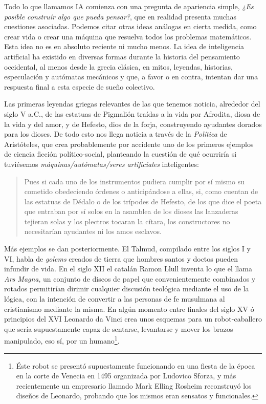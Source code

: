\documentclass[12pt]{memoir}
\begin{document}
Todo lo que llamamos IA comienza con una pregunta de apariencia simple, \textit{¿Es posible construír algo que pueda pensar?}, que en realidad presenta muchas cuestiones asociadas. Podemos citar otras ideas análogas en cierta medida, como crear vida o crear una máquina que resuelva todos los problemas matemáticos. Esta idea no es en absoluto reciente ni mucho menos. La idea de inteligencia artificial ha existido en diversas formas durante la historia del pensamiento occidental, al menos desde la grecia clásica, en mitos, leyendas, historias, especulación y autómatas mecánicos y que, a favor o en contra, intentan dar una respuesta final a esta especie de sueño colectivo.

Las primeras leyendas griegas relevantes de las que tenemos noticia, alrededor del siglo V a.C., de las estatuas de Pigmalión traídas a la vida por Afrodita, diosa de la vida y del amor, y de Hefesto, dios de la forja, construyendo ayudantes dorados para los dioses. De todo esto nos llega noticia a través de la \textit{Política} de Aristóteles, que crea probablemente por accidente uno de los primeros ejemplos de ciencia ficción político-social, planteando la cuestión de qué ocurriría si tuviésemos \textit{máquinas/autómatas/seres artificiales} inteligentes:

\blockquote{Pues si cada uno de los instrumentos pudiera cumplir por sí mismo su cometido obedeciendo órdenes o anticipándose a ellas, si, como cuentan de las estatuas de Dédalo o de los trípodes de Hefesto, de los que dice el poeta que entraban por sí solos en la asamblea de los dioses las lanzaderas tejieran solas y los plectros tocaran la cítara, los constructores no necesitarían ayudantes ni los amos esclavos. \parencite[Aristot. Pol. 1.1253b]{aristotlePolitics}}

Más ejemplos se dan posteriormente. El Talmud, compilado entre los siglos I y VI, habla de \textit{golems} creados de tierra que hombres santos y doctos pueden infundir de vida. En el siglo XII el catalán Ramon Llull inventa lo que el llama \textit{Ars Magna}, un conjunto de discos de papel que convenientemente combinados y rotados permitirían dirimir cualquier discusión teológica mediante el uso de la lógica, con la intención de convertir a las personas de fe musulmana al cristianismo mediante la misma. En algún momento entre finales del siglo XV ó principios del XVI Leonardo da Vinci crea unos esquemas para un robot-caballero que sería supuestamente capaz de sentarse, levantarse y mover los brazos manipulado, eso sí, por un humano\footnote{Éste robot se presentó supuestamente funcionando en una fiesta de la época en la corte de Venecia en 1495 organizada por Ludovico Sforza, y más recientemente un empresario llamado Mark Elling Rosheim reconstruyó los diseños de Leonardo, probando que los mismos eran sensatos y funcionales.}. 
\end{document}
